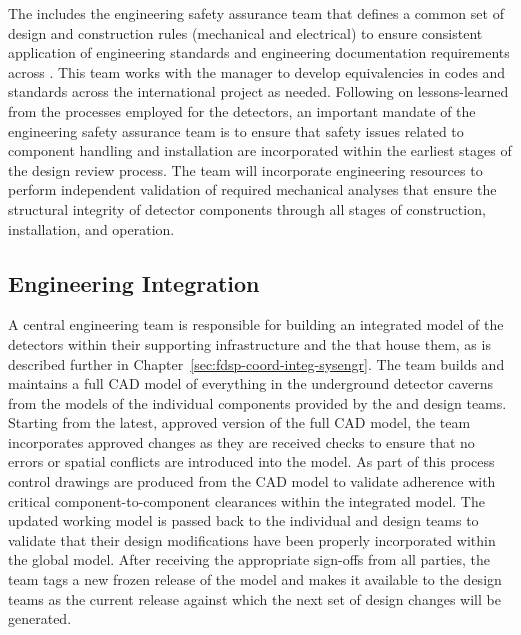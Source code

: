 The  includes the engineering safety assurance team that
defines a common set of design and construction rules (mechanical and
electrical) to ensure consistent application of engineering standards
and engineering documentation requirements across .
This team works with the   manager to develop
equivalencies in codes and standards across the international project
as needed.  Following on lessons-learned from the processes employed
for the  detectors, an important mandate of the
engineering safety assurance team is to ensure that safety issues
related to component handling and installation are incorporated within
the earliest stages of the design review process.  The 
team will incorporate engineering resources to perform independent
validation of required mechanical analyses that ensure the structural
integrity of detector components through all stages of construction,
installation, and operation.

\subsection{Engineering Integration}
\label{sec:dune_engineering}

A central  engineering team is responsible for building an
integrated model of the detectors within their supporting
infrastructure and the  that house them, as is described
further in Chapter~\ref{sec:fdsp-coord-integ-sysengr}.  The team
builds and maintains a full \threed CAD model of everything in the
underground detector caverns from the models of the individual
components provided by the  and  design teams.
Starting from the latest, approved version of the full CAD model, the
 team incorporates approved changes as they are received
checks to ensure that no errors or spatial
conflicts are introduced into the model.  As part of this process
\twod control drawings are produced from the \threed CAD
model to validate adherence with critical
component-to-component clearances within the integrated
model.  The updated working model is passed back to the individual
 and  design teams to validate that their
design modifications have been properly incorporated within the global
model.  After receiving the appropriate sign-offs from all parties,
the  team tags a new frozen release of the model and makes
it available to the design teams as the current release against which
the next set of design changes will be generated.

